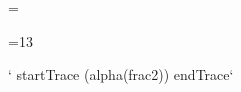 \newtoks\csNameStr
\def\parseLetterOrCS#1{%
    \def\todo{\ifcat\nextTok a\def\next{\csNameStr={#1}\parseCS}%
                \else\def\next{\addLexed#1\lexTokens}\fi\next}%
    \futurelet\nextTok\todo
}
\def\parseCS{\futurelet\nextTok\parseCSa}
\def\parseCSa{%
    \ifcat\nextTok a\def\next{\addToCSAndCont}%
    \else\def\next{\emitCSAndLex}%
    \fi\next
}
\def\addToCSAndCont#1{%
    \appendTok\csNameStr#1%
    \next\parseCS
}
\def\emitCSAndLex{%
    \edef\nextL{\the\csNameStr}
    \expandafter\expandafter\expandafter\addLexed\expandafter\csname\nextL\endcsname\lexTokens
}



\begingroup
{}=\active
\gdef\defParenCmds{%
    \def\lparen{\char40}%
    \catcode40=13%
    \let(=\parenFunc
}
\endgroup



\newtoks\parenContents
\newcount\parenLevel

\begingroup
{}=13
\gdef\parenWrap#1{\parenLevel=0\parenContents={}\buildList#1}
\gdef\buildList#1#2{%
    \ifx#2)\ifnum\parenLevel>0\def\next{\advance\parenLevel-1%
                                \appendTok\parenContents#2\buildList#1}%
            \else\let\next=#1\fi
    \else\ifx#2(\advance\parenLevel by 1\fi
        \def\next{\appendTok\parenContents{#2}\buildList#1}%
    \fi
    \next
}
\endgroup


\def\parenFunc{\parenWrap\parenFuncA}
\def\parenFuncA{\left(\the\parenContents\right)}


\def\startTrace{\message{Starting trace...}\tracingmacros=2\tracingassigns=2\tracingcommands=2}
\def\endTrace{\message{Ending trace...}\tracingmacros=0\tracingassigns=0\tracingcommands=0}


\def\frac{{2\over\alpha}}
\def\fracfrac{{2^{10}\over\alpha}}
` startTrace (alpha(frac2)) endTrace`

\bye

